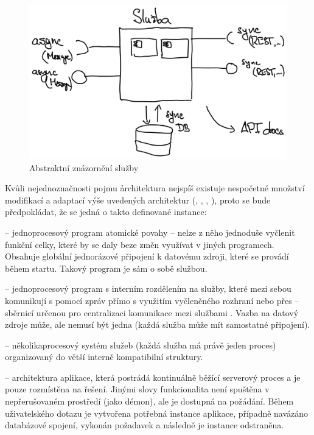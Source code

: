 \begin{figure}[htbp]
   \centering
   \includegraphics[max width=\textwidth]{assets/draft-service}
   \caption{Abstraktní znázornění služby}\label{fig:service-abstract}
\end{figure}


Kvůli nejednoznačnosti pojmu \h{architektura} nejspíš existuje nespočetné množství modifikací a adaptací výše uvedených architektur (, , , ), proto se bude předpokládat, že se jedná o takto definované instance:

\begin{dl}
   \item[\g{MA}] – jednoprocesový program atomické povahy – nelze z něho jednoduše vyčlenit funkční celky, které by se daly beze změn využívat v jiných programech.
   Obsahuje globální jednorázové připojení k datovému zdroji, které se provádí během startu.
   Takový program je sám o sobě službou.
   \item[\g{SOA}] – jednoprocesový program s interním rozdělením na služby, které mezi sebou komunikují s pomocí zpráv přímo s využitím vyčleněného rozhraní nebo přes  – sběrnicí určenou pro centralizaci komunikace mezi službami .
   Vazba na datový zdroje může, ale nemusí být jedna (každá služba může mít samostatné připojení).
   \item[\g{MSA}] – několikaprocesový systém služeb (každá služba má právě jeden proces) organizovaný do větší interně kompatibilní struktury.
   \item[\g{SA}] – architektura aplikace, která postrádá kontinuálně běžící serverový proces a je pouze rozmístěna na  řešení.
   Jinými slovy funkcionalita není spuštěna v nepřerušovaném prostředí (jako démon), ale je dostupná na požádání.
   Během uživatelského dotazu je vytvořena potřebná instance aplikace, případně navázáno databázové spojení, vykonán požadavek a následně je instance odstraněna.
\end{dl}












